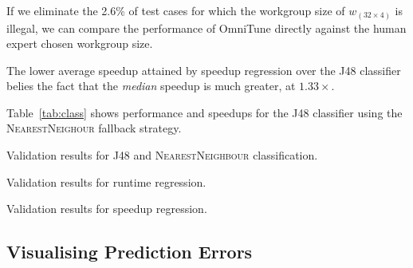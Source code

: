 If we eliminate the 2.6\% of test cases for which the workgroup size
of $w_{(32 \times 4)}$ is illegal, we can compare the performance of
OmniTune directly against the human expert chosen workgroup size.

The lower average speedup attained by speedup regression over the J48
classifier belies the fact that the \emph{median} speedup is much
greater, at $1.33 \times$.

Table~\ref{tab:class} shows performance and speedups for the J48
classifier using the \textsc{NearestNeighour} fallback
strategy. %



\begin{table}
\scriptsize
\centering
{}

\caption{Validation results for J48 and \textsc{NearestNeighbour}
  classification.}
\label{tab:class}
\end{table}
\begin{table}
\scriptsize
\centering
{}

\caption{Validation results for runtime regression.}
\label{tab:runtime-class}
\end{table}
\begin{table}
\scriptsize
\centering
{}

\caption{Validation results for speedup regression.}
\label{tab:speedup-class}
\end{table}


\subsection{Visualising Prediction Errors}

